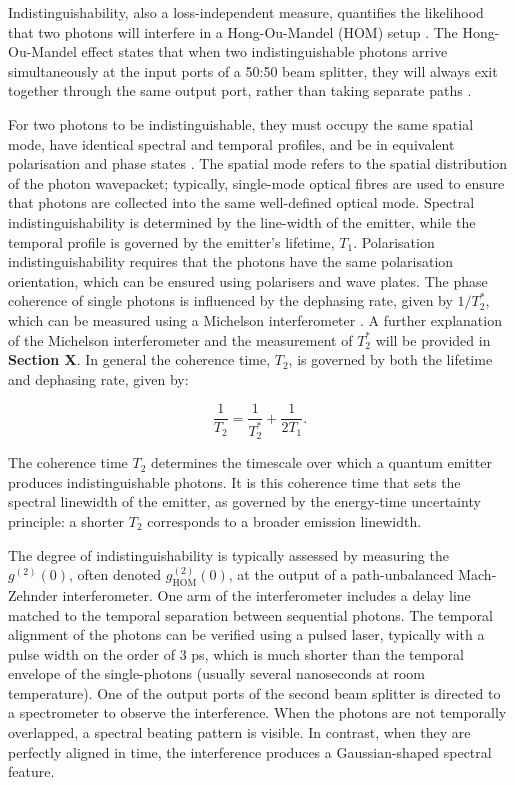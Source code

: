 Indistinguishability, also a loss-independent measure, quantifies the likelihood that two photons will interfere in a Hong-Ou-Mandel (HOM) setup \cite{Hong1987}. The Hong-Ou-Mandel effect states that when two indistinguishable photons arrive simultaneously at the input ports of a 50:50 beam splitter, they will always exit together through the same output port, rather than taking separate paths \cite{Hong1987}.

For two photons to be indistinguishable, they must occupy the same spatial mode, have identical spectral and temporal profiles, and be in equivalent polarisation and phase states \cite{Senellart2017}. The spatial mode refers to the spatial distribution of the photon wavepacket; typically, single-mode optical fibres are used to ensure that photons are collected into the same well-defined optical mode. Spectral indistinguishability is determined by the line-width of the emitter, while the temporal profile is governed by the emitter’s lifetime, $T_1$. Polarisation indistinguishability requires that the photons have the same polarisation orientation, which can be ensured using polarisers and wave plates. The phase coherence of single photons is influenced by the dephasing rate, given by $1/T_2^*$, which can be measured using a Michelson interferometer \cite{Michelson1887}. A further explanation of the Michelson interferometer and the measurement of $T_2^*$ will be provided in \textbf{Section X}. In general the coherence time, $T_2$, is governed by both the lifetime and dephasing rate, given by:

\begin{equation}
    \frac{1}{T_2}=\frac{1}{T_2^*} + \frac{1}{2T_1}.
\end{equation}

The coherence time $T_2$ determines the timescale over which a quantum emitter produces indistinguishable photons. It is this coherence time that sets the spectral linewidth of the emitter, as governed by the energy-time uncertainty principle: a shorter $T_2$  corresponds to a broader emission linewidth.

The degree of indistinguishability is typically assessed by measuring the $g^{(2)}(0)$, often denoted $g^{(2)}_{\text{HOM}}(0)$, at the output of a path-unbalanced Mach-Zehnder interferometer. One arm of the interferometer includes a delay line matched to the temporal separation between sequential photons. The temporal alignment of the photons can be verified using a pulsed laser, typically with a pulse width on the order of 3 ps, which is much shorter than the temporal envelope of the single-photons (usually several nanoseconds at room temperature). One of the output ports of the second beam splitter is directed to a spectrometer to observe the interference. When the photons are not temporally overlapped, a spectral beating pattern is visible. In contrast, when they are perfectly aligned in time, the interference produces a Gaussian-shaped spectral feature. 

